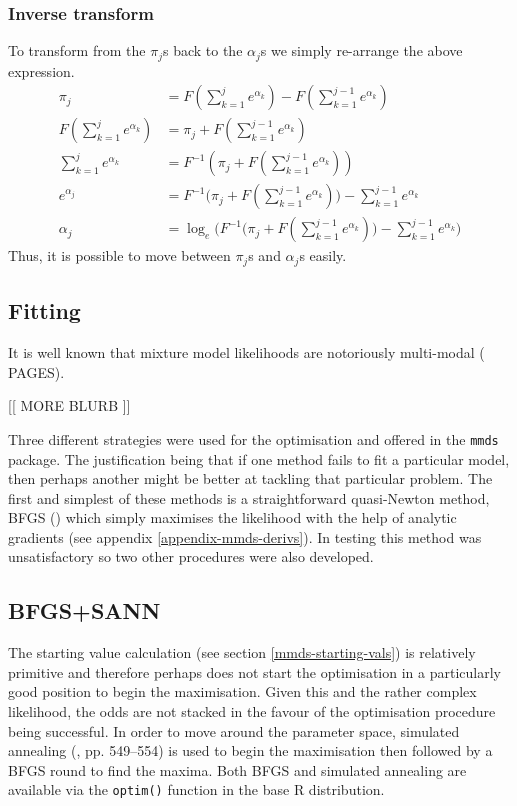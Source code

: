 \subsubsection{Inverse transform}
\label{mmds-pi-inv}
To transform from the $\pi_j$s back to the $\alpha_j$s we simply re-arrange the above expression.
\begin{align*}
\pi_j &= F(\sum_{k=1}^j e^{\alpha_k}) - F(\sum_{k=1}^{j-1} e^{\alpha_k})\\
F(\sum_{k=1}^j e^{\alpha_k}) &= \pi_j + F(\sum_{k=1}^{j-1} e^{\alpha_k})\\
\sum_{k=1}^j e^{\alpha_k} &= F^{-1}(\pi_j + F(\sum_{k=1}^{j-1} e^{\alpha_k}))\\
e^{\alpha_j} &= F^{-1}\Big(\pi_j + F(\sum_{k=1}^{j-1} e^{\alpha_k})\Big) - \sum_{k=1}^{j-1} e^{\alpha_k}\\
\alpha_j &= \log_e \Big(F^{-1}\Big(\pi_j + F(\sum_{k=1}^{j-1} e^{\alpha_k})\Big) - \sum_{k=1}^{j-1} e^{\alpha_k}\Big)
\end{align*}
Thus, it is possible to move between $\pi_j$s and $\alpha_j$s easily.

\subsection{Fitting}
It is well known that mixture model likelihoods are notoriously multi-modal (\cite{BDA} PAGES).

[[ MORE BLURB ]]

Three different strategies were used for the optimisation and offered in the \texttt{mmds} package. The justification being that if one method fails to fit a particular model, then perhaps another might be better at tackling that particular problem. The first and simplest of these methods is a straightforward quasi-Newton method, BFGS (\cite{bfgs}) which simply maximises the likelihood with the help of analytic gradients (see appendix \ref{appendix-mmds-derivs}). In testing this method was unsatisfactory so two other procedures were also developed.

\subsection{BFGS+SANN}
The starting value calculation (see section \ref{mmds-starting-vals}) is relatively primitive and therefore perhaps does not start the optimisation in a particularly good position to begin the maximisation. Given this and the rather complex likelihood, the odds are not stacked in the favour of the optimisation procedure being successful. In order to move around the parameter space, simulated annealing (\cite{numrec}, pp. 549--554) is used to begin the maximisation then followed by a BFGS round to find the maxima. Both BFGS and simulated annealing are available via the \texttt{optim()} function in the base \textsf{R} distribution.

